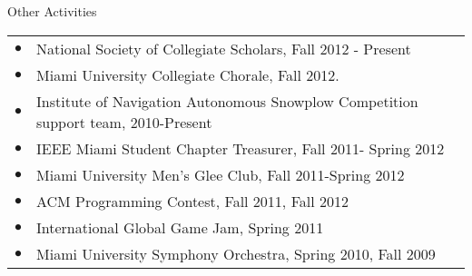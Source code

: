 \documentclass{resume} %
\begin{document}
\begin{rSection}{Other Activities}
  \begin{tabular}{ll}
    $\bullet$ & National Society of Collegiate Scholars, Fall 2012 - Present\\
    $\bullet$ & Miami University Collegiate Chorale, Fall 2012.\\
    $\bullet$ & Institute of Navigation Autonomous Snowplow Competition support team, 2010-Present\\
    $\bullet$ & IEEE Miami Student Chapter Treasurer, Fall 2011- Spring 2012\\
    $\bullet$ & Miami University Men’s Glee Club, Fall 2011-Spring 2012\\
    $\bullet$ & ACM Programming Contest, Fall 2011, Fall 2012\\
    $\bullet$ & International Global Game Jam, Spring 2011\\
    $\bullet$ & Miami University Symphony Orchestra, Spring 2010, Fall 2009\\[5 mm]
  \end{tabular}
\end{rSection}
\end{document}
